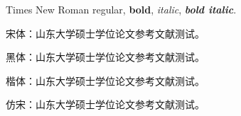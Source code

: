 \documentclass{article}
\begin{document}
Times New Roman regular, \textbf{bold}, \textit{italic},
\textbf{\textit{bold italic}}.

宋体：山东大学硕士学位论文参考文献测试。

{\sffamily 黑体：山东大学硕士学位论文参考文献测试。}

{\ttfamily 楷体：山东大学硕士学位论文参考文献测试。}

{ 仿宋：山东大学硕士学位论文参考文献测试。}
\end{document}
